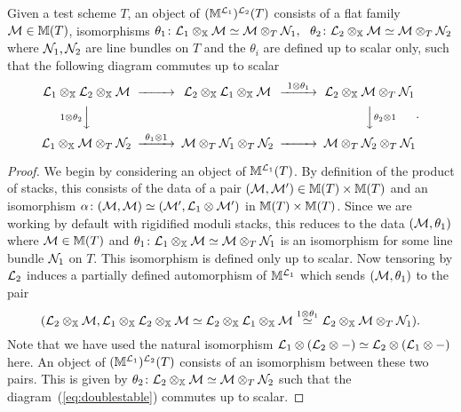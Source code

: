 \documentclass[12pt]{amsart}
\begin{document}
\begin{proposition}  \label{prop:doublestable}
Given a test scheme $T$, an object of $(\mathbb{M}^{\mathcal{L}_1})^{\mathcal{L}_2}(T)$ consists of a flat family $\mathcal{M} \in \mathbb{M}(T)$, isomorphisms $\theta_1 \colon \mathcal{L}_1 \otimes_{\mathbb{X}} \mathcal{M} \simeq \mathcal{M} \otimes_T \mathcal{N}_1, \ \ \theta_2 \colon \mathcal{L}_2 \otimes_{\mathbb{X}} \mathcal{M} \simeq \mathcal{M} \otimes_T \mathcal{N}_2$ where $\mathcal{N}_1, \mathcal{N}_2$ are line bundles on $T$ and the $\theta_i$ are defined up to scalar only, such that the following diagram commutes up to scalar
\begin{equation} \label{eq:doublestable}
\begin{CD}
\cL_1 \otimes_{\bX} \cL_2 \otimes_{\bX} \cM @>>> \cL_2 \otimes_{\bX} \cL_1 \otimes_{\bX} \cM @>{1 \otimes \theta_1}>> \cL_2 \otimes_{\bX} \cM \otimes_T \cN_1 \\
@V{1 \otimes \theta_2}VV @. @VV{\theta_2 \otimes 1}V \\
\cL_1 \otimes_{\bX} \cM \otimes_T \cN_2 @>{\theta_1 \otimes 1}>> \cM \otimes_T \cN_1 \otimes_T \cN_2 @>>> 
\cM \otimes_T \cN_2 \otimes_T \cN_1
\end{CD}.
\end{equation}
\end{proposition}
\begin{proof}
We begin by considering an object of $\mathbb{M}^{\mathcal{L}_1}(T)$. By definition of the product of stacks, this consists of the data of a pair $(\mathcal{M}, \mathcal{M}') \in \mathbb{M}(T) \times\mathbb{M}(T)$ and an isomorphism $\alpha \colon (\mathcal{M}, \mathcal{M}) \simeq (\mathcal{M}', \mathcal{L}_1 \otimes \mathcal{M}')$ in $\mathbb{M}(T) \times \mathbb{M}(T)$. Since we are working by default with rigidified moduli stacks, this reduces to the data $(\mathcal{M}, \theta_1)$ where $\mathcal{M} \in \mathbb{M}(T)$ and $\theta_1 \colon \mathcal{L}_1 \otimes_{\mathbb{X}} \mathcal{M} \simeq \mathcal{M} \otimes_T \mathcal{N}_1$ is an isomorphism for some line bundle $\mathcal{N}_1$ on $T$. This isomorphism is defined only up to scalar. Now tensoring by $\mathcal{L}_2$ induces a partially defined automorphism of $\mathbb{M}^{\mathcal{L}_1}$ which sends $(\mathcal{M},\theta_1)$ to the pair 
$$(\mathcal{L}_2 \otimes_{\mathbb{X}} \mathcal{M}, \mathcal{L}_1 \otimes_{\mathbb{X}} \mathcal{L}_2 \otimes_{\mathbb{X}} \mathcal{M} \simeq \mathcal{L}_2 \otimes_{\mathbb{X}} \mathcal{L}_1 \otimes_{\mathbb{X}} \mathcal{M} \stackrel{1 \otimes \theta_1}{\simeq} \mathcal{L}_2 \otimes_{\mathbb{X}} \mathcal{M} \otimes_T \mathcal{N}_1).$$
Note that we have used the natural isomorphism $\mathcal{L}_1 \otimes (\mathcal{L}_2 \otimes -) \simeq \mathcal{L}_2 \otimes (\mathcal{L}_1 \otimes -)$ here. An object of $(\mathbb{M}^{\mathcal{L}_1})^{\mathcal{L}_2}(T)$ consists of an isomorphism between these two pairs. This is given by $\theta_2 \colon \mathcal{L}_2 \otimes_{\mathbb{X}} \mathcal{M} \simeq \mathcal{M} \otimes_T \mathcal{N}_2$ such that the diagram~(\ref{eq:doublestable}) commutes up to scalar.
\end{proof}
\end{document}
